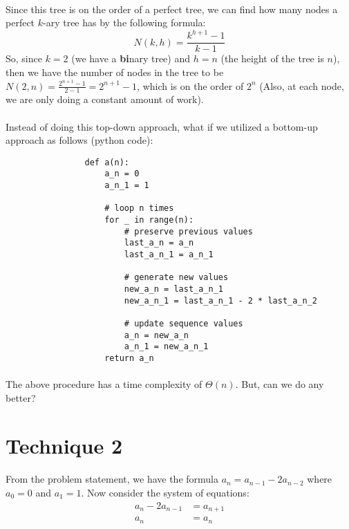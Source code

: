 \documentclass{article}
\begin{document}
		\paragraph{}
        	Since this tree is on the order of a perfect tree, 
            	we can find how many nodes a perfect $k$-ary tree has by the following formula:
                	$$N(k, h) = \frac{k^{h+1}-1}{k-1}$$
            So, since $k = 2$ (we have a \textbf{bi}nary tree) and $h = n$ (the height of the tree is $n$),
            	then we have the number of nodes in the tree to be $N(2, n) = \frac{2^{n+1}-1}{2-1} = 2^{n+1}-1$,
                	which is on the order of $2^n$ (Also, at each node, we are only doing a constant amount of work).
		\paragraph{}
        	Instead of doing this top-down approach, what if we utilized a bottom-up approach as follows (python code):
            \begin{verbatim}
                def a(n):
                    a_n = 0
                    a_n_1 = 1
                    
                    # loop n times
                    for _ in range(n):
                        # preserve previous values
                        last_a_n = a_n
                        last_a_n_1 = a_n_1
                    	
                        # generate new values
                        new_a_n = last_a_n_1
                        new_a_n_1 = last_a_n_1 - 2 * last_a_n_2
                        
                        # update sequence values
                        a_n = new_a_n
                        a_n_1 = new_a_n_1
                    return a_n
            \end{verbatim}
        \paragraph{}
        	The above procedure has a time complexity of $\Theta(n)$. But, can we do any better?
    
    
    \section {Technique 2}
    	\paragraph{}
        	From the problem statement, we have the formula $a_n = a_{n-1} - 2a_{n-2}$ where $a_0 = 0$ and $a_1 = 1$.
            Now consider the system of equations:
           	\begin{align*}
           		a_{n} - 2a_{n-1} &= a_{n+1}\\
                a_{n}            &= a_{n}
           	\end{align*}
\end{document}
